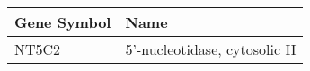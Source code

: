 \begin{tabular}{ll}
\toprule
Gene Symbol &                          Name \\
\midrule
      NT5C2 & 5'-nucleotidase, cytosolic II \\
\bottomrule
\end{tabular}
